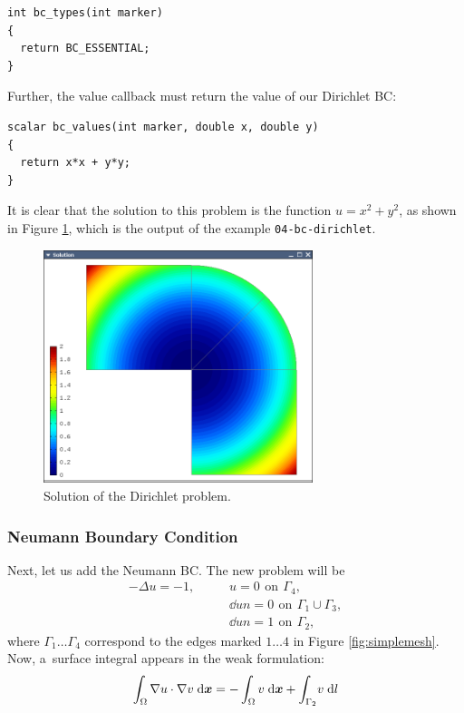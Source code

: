 \begin{lstlisting}
int bc_types(int marker)
{
  return BC_ESSENTIAL;
}
\end{lstlisting}

Further, the value callback must return the value of our Dirichlet BC:

\begin{lstlisting}
scalar bc_values(int marker, double x, double y)
{
  return x*x + y*y;
}
\end{lstlisting}

It is clear that the solution to this problem is the function $u = x^2 + y^2$, as shown
in Figure \ref{fig:dirichlet}, which is the output of the example
{\tt 04-bc-dirichlet}.

\begin{figure}[ht]
  \centering\medskip
  \includegraphics[width=0.7\textwidth]{img/dirichlet.png}
  \caption{Solution of the Dirichlet problem.}
  \label{fig:dirichlet}
\end{figure}


\subsubsection{Neumann Boundary Condition}

Next, let us add the Neumann BC. The new problem will be
\begin{eqnarray*}
  -\Delta u = -1,\ \ \ \ \ &&u = 0\,\ \mbox{on}\,\ \Gamma_4,\\
                           &&\dd{u}{n} = 0\,\ \mbox{on}\,\ \Gamma_1 \cup \Gamma_3,\\
                           &&\dd{u}{n} = 1\,\ \mbox{on}\,\ \Gamma_2,
\end{eqnarray*}
where $\Gamma_1 \dots \Gamma_4$ correspond to the edges marked $1 \dots 4$ in Figure
\ref{fig:simplemesh}. Now, a~surface integral appears in the weak formulation:
$$\int_\Omega \nabla u \cdot \nabla v \;\mbox{d\mbox{\boldmath $x$}} =
  -\int_\Omega v \;\mbox{d\mbox{\boldmath $x$}} + \int_{\Gamma_2} \!v \;\mbox{d}l$$

